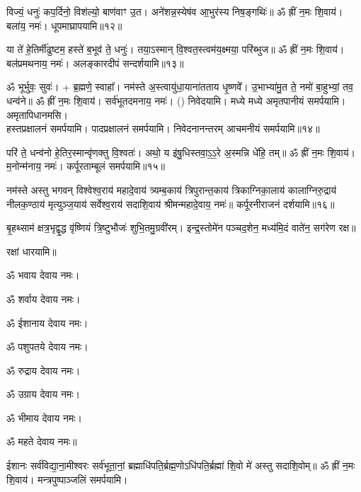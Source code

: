 \begingroup
\centering
\setlength{\columnseprule}{1pt}
\let\chapt\sect


\endgroup
{\small \closesection}


\begingroup
\centering
\setlength{\columnseprule}{1pt}
\let\chapt\sect


\endgroup




विज्यं॒ धनुः॑ कप॒र्दिनो॒ विश॑ल्यो॒ बाण॑वाꣳ उ॒त। अने॑शन्न॒\-स्येष॑व आ॒भुर॑स्य निष॒ङ्गथिः॑॥ ॐ ह्रीं न॒मः शि॒वाय॑। बला॑य॒ नमः॑। धूपमाघ्रापयामि॥१२॥

या ते॑ हे॒तिर्मी॑ढुष्टम॒ हस्ते॑ ब॒भूव॑ ते॒ धनुः॑। तया॒ऽस्मान् वि॒श्वत॒स्त्वम॑य॒क्ष्मया॒ परि॑ब्भुज॥ ॐ ह्रीं न॒मः शि॒वाय॑। बल॑प्रमथनाय॒ नमः॑। अलङ्कारदीपं सन्दर्शयामि॥१३॥

ॐ भूर्भुवः॒ सुवः॑। + ब्र॒ह्मणे॒ स्वाहा᳚। नम॑स्ते अ॒स्त्वायु॑धा॒याना॑तताय धृ॒ष्णवे᳚। उ॒भाभ्या॑मु॒त ते॒ नमो॑ बा॒हुभ्यां॒ तव॒ धन्व॑ने॥ ॐ ह्रीं न॒मः शि॒वाय॑। सर्व॑भूतदमनाय॒ नमः॑। () निवेदयामि। मध्ये मध्ये अमृतपानीयं समर्पयामि। अमृतापिधानमसि।\\
हस्तप्रक्षालनं समर्पयामि। पादप्रक्षालनं समर्पयामि। निवेदनानन्तरम् आचमनीयं समर्पयामि॥१४॥

परि॑ ते॒ धन्व॑नो हे॒तिर॒स्मान्वृ॑णक्तु वि॒श्वतः॑। अथो॒ य इ॑षु॒धिस्तवा॒ऽ॒ऽ॒रे अ॒स्मन्नि धे॑हि॒ तम्॥ ॐ ह्रीं न॒मः शि॒वाय॑। म॒नोन्म॑नाय॒ नमः॑। कर्पूरताम्बूलं समर्पयामि॥१५॥

नम॑स्ते अस्तु भगवन् विश्वेश्व॒राय॑ महादे॒वाय॑ त्र्यम्ब॒काय॑ त्रिपुरान्त॒काय॑ त्रिकाग्निका॒लाय॑ कालाग्निरु॒द्राय॑ नीलक॒ण्ठाय॑ मृत्युञ्ज॒याय॑ सर्वेश्व॒राय॑ सदाशि॒वाय॑ श्रीमन्महादे॒वाय॒ नमः॑॥ कर्पूरनीराजनं दर्शयामि॥१६॥

बृ॒हथ्साम॑ क्षत्र॒भृद्वृ॒द्ध वृ॑ष्णियं त्रि॒ष्टुभौजः॑ शुभि॒तमु॒ग्रवी॑रम्।
इन्द्र॒स्तोमे॑न पञ्चद॒शेन॒ मध्य॑मि॒दं वाते॑न॒ सग॑रेण रक्ष॥

रक्षां धारयामि॥

ॐ भवाय देवाय नमः। 

ॐ शर्वाय देवाय नमः। 

ॐ ईशानाय देवाय नमः। 

ॐ पशुपतये देवाय नमः। 

ॐ रुद्राय देवाय नमः। 

ॐ उग्राय देवाय नमः। 

ॐ भीमाय देवाय नमः। 

ॐ महते देवाय नमः॥


ईशानः सर्व॑विद्या॒ना॒मीश्वरः सर्व॑भूता॒नां॒ ब्रह्माधि॑पति॒र्ब्रह्म॒णो\-ऽधि॑पति॒र्ब्रह्मा॑ शि॒वो मे॑ अस्तु सदाशि॒वोम्॥ ॐ ह्रीं न॒मः शि॒वाय॑। मन्त्रपुष्पाञ्जलिं समर्पयामि।   


